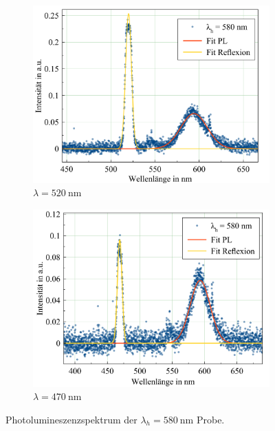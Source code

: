 \begin{figure}[H]
  \centering
  \begin{subfigure}{0.49\textwidth}
    \includegraphics[width=\textwidth]{plots/Weisslicht_580_520.png}
    \caption{$\lambda=\SI{520}{\nano\meter}$}
    \label{fig:PL_580_normus}
  \end{subfigure}
  \begin{subfigure}{0.49\textwidth}
    \includegraphics[width=\textwidth]{plots/Weisslicht_580_470.png}
    \caption{$\lambda=\SI{470}{\nano\meter}$}
    \label{fig:PL_580_Satt}
  \end{subfigure}
  \caption{Photolumineszenzspektrum der $\lambda_h=\SI{580}{\nano\meter}$ Probe.}
  \label{fig:PL_580}
\end{figure}
